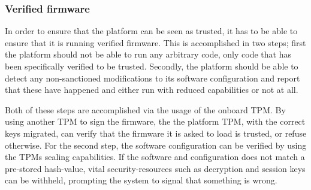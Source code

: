 \documentclass[10pt]{article}
\begin{document}
      \subsubsection{Verified firmware}

        In order to ensure that the platform can be seen as trusted, it has to
        be able to ensure that it is running verified firmware. This is
        accomplished in two steps; first the platform should not be able to run
        any arbitrary code, only code that has been specifically verified to be
        trusted. Secondly, the platform should be able to detect any
        non-sanctioned modifications to its software configuration and report
        that these have happened and either run with reduced capabilities or
        not at all.

        Both of these steps are accomplished via the usage of the onboard TPM.
        By using another TPM to sign the firmware, the the platform TPM, with
        the correct keys migrated, can verify that the firmware it is asked to
        load is trusted, or refuse otherwise. For the second step, the software
        configuration can be verified by using the TPMs sealing capabilities.
        If the software and configuration does not match a pre-stored
        hash-value, vital security-resources such as decryption and session keys
        can be withheld, prompting the system to signal that something is
        wrong.
\end{document}
